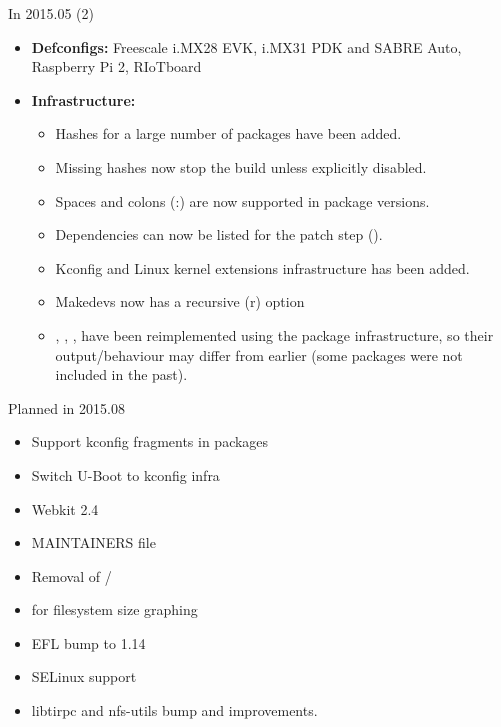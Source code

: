 \begin{frame}{In 2015.05 (2)}
  \begin{itemize}
  \item {\bf Defconfigs:} Freescale i.MX28 EVK, i.MX31 PDK and SABRE
    Auto, Raspberry Pi 2, RIoTboard
  \item {\bf Infrastructure:}
    \begin{itemize}
    \item Hashes for a large number of packages have
      been added.
    \item Missing hashes now stop the build unless
      explicitly disabled.
    \item Spaces and colons (:) are now supported in package versions.
    \item Dependencies can now be listed for the patch step
      ().
    \item Kconfig and Linux kernel extensions infrastructure has
      been added.
    \item Makedevs now has a recursive (r) option
    \item {}, , ,
       have been reimplemented using the package
      infrastructure, so their output/behaviour may differ from
      earlier (some packages were not included in the past).
    \end{itemize}
  \end{itemize}
\end{frame}

\begin{frame}{Planned in 2015.08}
  \begin{itemize}
  \item Support kconfig fragments in  packages
  \item Switch U-Boot to kconfig infra
  \item Webkit 2.4
  \item MAINTAINERS file
  \item Removal of /
  \item {} for filesystem size graphing
  \item EFL bump to 1.14
  \item SELinux support
  \item libtirpc and nfs-utils bump and improvements.
  \end{itemize}
\end{frame}
